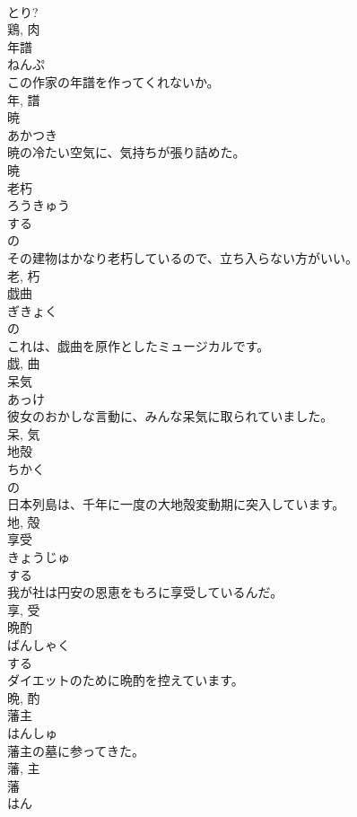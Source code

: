 \documentclass[8pt]{extreport}
\begin{document}
\begin{CJK}{UTF8}{min}
\\	とり? 
\\	鶏, 肉	
\\	年譜	
\\	ねんぷ	
\\	この作家の年譜を作ってくれないか。	
\\	年, 譜	
\\	暁	
\\	あかつき	
\\	暁の冷たい空気に、気持ちが張り詰めた。	
\\	暁	
\\	老朽	
\\	ろうきゅう	
\\	する 
\\	の 
\\	その建物はかなり老朽しているので、立ち入らない方がいい。	
\\	老, 朽	
\\	戯曲	
\\	ぎきょく	
\\	の 
\\	これは、戯曲を原作としたミュージカルです。	
\\	戯, 曲	
\\	呆気	
\\	あっけ	
\\	彼女のおかしな言動に、みんな呆気に取られていました。	
\\	呆, 気	
\\	地殻	
\\	ちかく	
\\	の 
\\	日本列島は、千年に一度の大地殻変動期に突入しています。	
\\	地, 殻	
\\	享受	
\\	きょうじゅ	
\\	する 
\\	我が社は円安の恩恵をもろに享受しているんだ。	
\\	享, 受	
\\	晩酌	
\\	ばんしゃく	
\\	する 
\\	ダイエットのために晩酌を控えています。	
\\	晩, 酌	
\\	藩主	
\\	はんしゅ	
\\	藩主の墓に参ってきた。	
\\	藩, 主	
\\	藩	
\\	はん	

\end{CJK}
\end{document}
